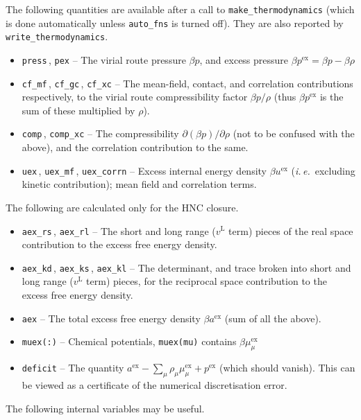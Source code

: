 \documentclass[12pt,a4paper]{article}
\newcommand{\latin}[1]{\emph{#1}}
\newcommand{\ie}{\latin{i.\,e.}}
\newcommand{\myex}{^{\mathrm{ex}}}
\newcommand{\pex}{p\myex}
\newcommand{\uex}{u\myex}
\newcommand{\aex}{a\myex}
\newcommand{\muex}{\mu\myex}
\newcommand{\lr}{^{\mathrm{L}}}
\begin{document}
%
The following quantities are available after a call to
\verb+make_thermodynamics+ (which is done automatically unless
\verb+auto_fns+ is turned off).  They are also reported by
\verb+write_thermodynamics+.
%
\begin{itemize}
%
\item\verb+press+\,, \verb+pex+ -- The virial route pressure $\beta p$,
  and excess pressure $\beta \pex=\beta p-\beta\rho$
%
\item\verb+cf_mf+\,, \verb+cf_gc+\,, \verb+cf_xc+ -- The mean-field,
  contact, and correlation contributions respectively, to the virial
  route compressibility factor $\beta p/\rho$ (thus $\beta\pex$ is the sum
  of these multiplied by $\rho$).
%
\item\verb+comp+\,, \verb+comp_xc+ -- The compressibility
  $\partial(\beta p)/\partial\rho$ (not to be confused with the
  above), and the correlation contribution to the same.
%
\item\verb+uex+\,, \verb+uex_mf+\,, \verb+uex_corrn+ -- Excess internal energy
  density $\beta\uex$ (\ie\ excluding kinetic contribution); mean
  field and correlation terms.
%
\end{itemize}
%
The following are calculated only for the HNC closure.
\begin{itemize}
%
\item\verb+aex_rs+\,, \verb+aex_rl+ -- The short and long range
  ($v\lr$ term) pieces of the real space contribution to the excess
  free energy density.
%
\item\verb+aex_kd+\,, \verb+aex_ks+\,, \verb+aex_kl+ -- The
  determinant, and trace broken into short and long range ($v\lr$
  term) pieces, for the reciprocal space contribution to the excess
  free energy density.
%
\item\verb+aex+ -- The total excess free energy density
  $\beta\aex$ (sum of all the above).
%
\item\verb+muex(:)+ -- Chemical potentials, \verb+muex(mu)+ contains
  $\beta\muex_\mu$
%
\item\verb+deficit+ -- The quantity $\aex - \sum_{\mu}\rho_\mu
  \muex_\mu + \pex$ (which should vanish).  This can be viewed as a certificate of
  the numerical discretisation error.
%
\end{itemize}
%
The following internal variables may be useful.
%
\end{document}
